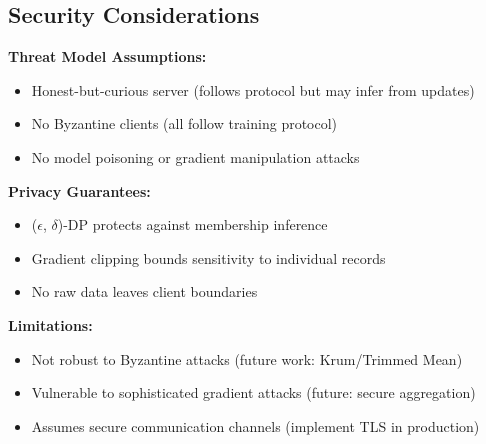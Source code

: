 \subsection{Security Considerations}

\textbf{Threat Model Assumptions:}
\begin{itemize}
    \item Honest-but-curious server (follows protocol but may infer from updates)
    \item No Byzantine clients (all follow training protocol)
    \item No model poisoning or gradient manipulation attacks
\end{itemize}

\textbf{Privacy Guarantees:}
\begin{itemize}
    \item ($\epsilon$, $\delta$)-DP protects against membership inference
    \item Gradient clipping bounds sensitivity to individual records
    \item No raw data leaves client boundaries
\end{itemize}

\textbf{Limitations:}
\begin{itemize}
    \item Not robust to Byzantine attacks (future work: Krum/Trimmed Mean)
    \item Vulnerable to sophisticated gradient attacks (future: secure aggregation)
    \item Assumes secure communication channels (implement TLS in production)
\end{itemize}
